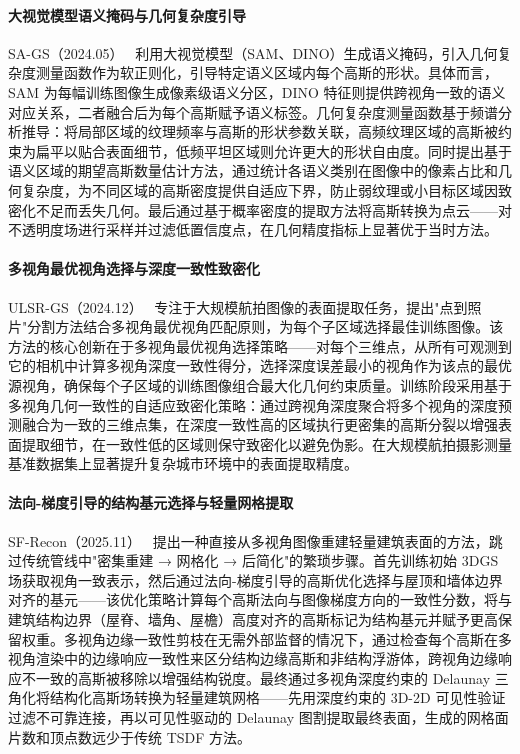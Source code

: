 \paragraph{大视觉模型语义掩码与几何复杂度引导}

SA-GS（2024.05）~\cite{2405_16923} 利用大视觉模型（SAM、DINO）生成语义掩码，引入几何复杂度测量函数作为软正则化，引导特定语义区域内每个高斯的形状。具体而言，SAM 为每幅训练图像生成像素级语义分区，DINO 特征则提供跨视角一致的语义对应关系，二者融合后为每个高斯赋予语义标签。几何复杂度测量函数基于频谱分析推导：将局部区域的纹理频率与高斯的形状参数关联，高频纹理区域的高斯被约束为扁平以贴合表面细节，低频平坦区域则允许更大的形状自由度。同时提出基于语义区域的期望高斯数量估计方法，通过统计各语义类别在图像中的像素占比和几何复杂度，为不同区域的高斯密度提供自适应下界，防止弱纹理或小目标区域因致密化不足而丢失几何。最后通过基于概率密度的提取方法将高斯转换为点云——对不透明度场进行采样并过滤低置信度点，在几何精度指标上显著优于当时方法。

\paragraph{多视角最优视角选择与深度一致性致密化}

ULSR-GS（2024.12）~\cite{2412_01402} 专注于大规模航拍图像的表面提取任务，提出"点到照片"分割方法结合多视角最优视角匹配原则，为每个子区域选择最佳训练图像。该方法的核心创新在于多视角最优视角选择策略——对每个三维点，从所有可观测到它的相机中计算多视角深度一致性得分，选择深度误差最小的视角作为该点的最优源视角，确保每个子区域的训练图像组合最大化几何约束质量。训练阶段采用基于多视角几何一致性的自适应致密化策略：通过跨视角深度聚合将多个视角的深度预测融合为一致的三维点集，在深度一致性高的区域执行更密集的高斯分裂以增强表面提取细节，在一致性低的区域则保守致密化以避免伪影。在大规模航拍摄影测量基准数据集上显著提升复杂城市环境中的表面提取精度。

\paragraph{法向-梯度引导的结构基元选择与轻量网格提取}

SF-Recon（2025.11）~\cite{2511_13278} 提出一种直接从多视角图像重建轻量建筑表面的方法，跳过传统管线中"密集重建 → 网格化 → 后简化"的繁琐步骤。首先训练初始 3DGS 场获取视角一致表示，然后通过法向-梯度引导的高斯优化选择与屋顶和墙体边界对齐的基元——该优化策略计算每个高斯法向与图像梯度方向的一致性分数，将与建筑结构边界（屋脊、墙角、屋檐）高度对齐的高斯标记为结构基元并赋予更高保留权重。多视角边缘一致性剪枝在无需外部监督的情况下，通过检查每个高斯在多视角渲染中的边缘响应一致性来区分结构边缘高斯和非结构浮游体，跨视角边缘响应不一致的高斯被移除以增强结构锐度。最终通过多视角深度约束的 Delaunay 三角化将结构化高斯场转换为轻量建筑网格——先用深度约束的 3D-2D 可见性验证过滤不可靠连接，再以可见性驱动的 Delaunay 图割提取最终表面，生成的网格面片数和顶点数远少于传统 TSDF 方法。

